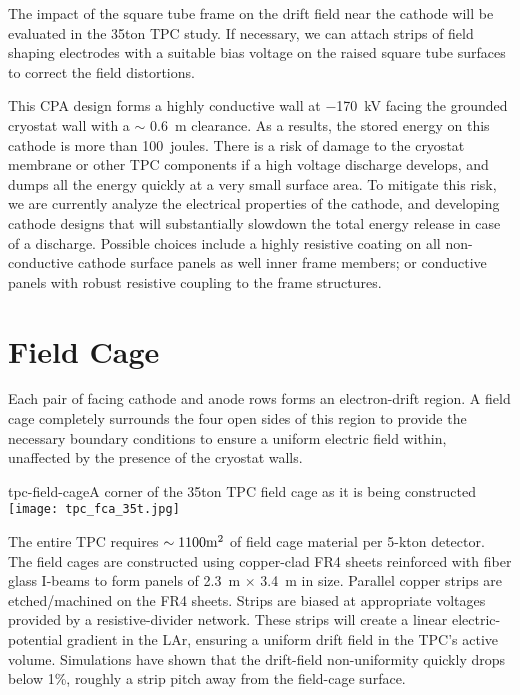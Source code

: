 The impact of the square tube frame on the drift field near the cathode will be evaluated in the 35ton TPC study.  If necessary, we can attach strips of field shaping electrodes with a suitable bias voltage on the raised square tube surfaces to correct the field distortions.  


This CPA design forms a highly conductive wall at $-$170~kV facing the grounded cryostat wall with a $\sim$ 0.6~m clearance.  As a results, the stored energy on this cathode is more than 100~joules.  There is a risk of damage to the cryostat membrane or other TPC components if a high voltage discharge develops, and dumps all the energy quickly at a very small surface area. To mitigate this risk, we are currently analyze the electrical properties of the cathode, and developing cathode designs that will substantially slowdown the total energy release in case of a discharge.  Possible choices include a highly resistive coating on all non-conductive cathode surface panels as well inner frame members; or conductive panels with robust resistive coupling to the frame structures.




\section{Field Cage}
\label{subsec:v5-tpc-chamber-fieldcage}

Each pair of facing cathode and anode rows forms an electron-drift region. A field cage  completely surrounds the four open sides of this region
to provide the necessary boundary conditions to ensure a uniform electric field within, unaffected by the presence of the cryostat walls.


\begin{cdrfigure}{tpc-field-cage}{A corner of the 35ton TPC field cage as it is being constructed}
\texttt{[image: tpc\_fca\_35t.jpg]}
\end{cdrfigure}


The entire TPC requires $\sim 1100 \rm{m}^2$ of field 
cage material per 5-kton detector. The field cages are constructed using copper-clad FR4 sheets reinforced with fiber glass I-beams to form panels of 2.3~m $\times$ 3.4~m in size. Parallel copper strips are etched/machined
on the FR4 sheets. Strips are 
biased at appropriate voltages provided by a resistive-divider network. These strips will create
a linear electric-potential gradient in the LAr, ensuring a uniform drift 
field in the TPC's active volume.  Simulations have shown that the drift-field non-uniformity quickly drops below 1\%, roughly 
a strip pitch away from the field-cage surface. 

